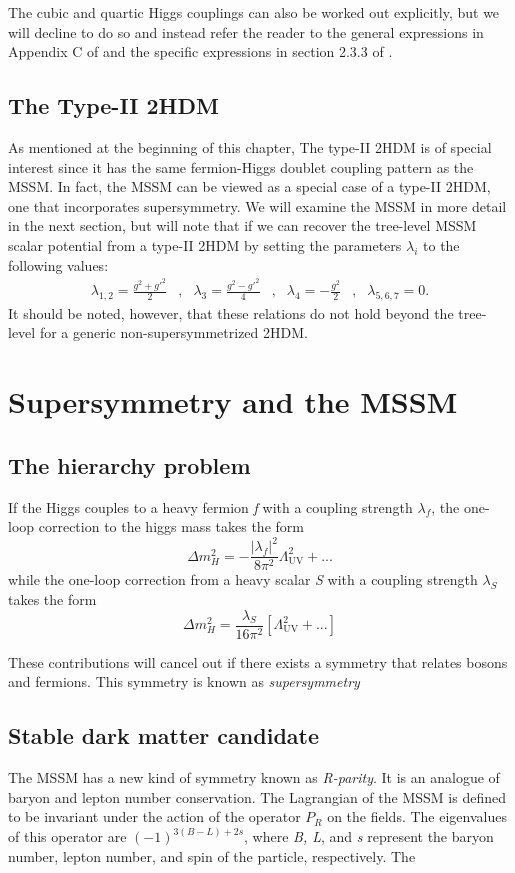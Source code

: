 The cubic and quartic Higgs couplings can also be worked out explicitly, but we will decline to do so and instead refer the reader to the general expressions in Appendix C of  \citep{Branco2012} and the specific expressions in section 2.3.3 of \citep{Kling2016a}. 

\subsection{The Type-II 2HDM}

As mentioned at the beginning of this chapter, The type-II 2HDM is of special interest since it has the same fermion-Higgs doublet coupling pattern as the MSSM. In fact, the MSSM can be viewed as a special case of a type-II 2HDM, one that incorporates supersymmetry. We will examine the MSSM in more detail in the next section, but will note that if we can recover the tree-level MSSM scalar potential from a type-II 2HDM by setting the parameters $\lambda_i$ to the following values:
\begin{align}
\lambda_{1,2} = \frac{g^2+g'^2}{2} &,& \lambda_3 = \frac{g^2-g'^2}{4} &,& \lambda_4 = -\frac{g^2}{2}&,&\lambda_{5,6,7} = 0.
\end{align}
It should be noted, however, that these relations do not hold beyond the tree-level for a generic non-supersymmetrized 2HDM.

\section{Supersymmetry and the MSSM}\label{sec:supersymmetry}

\subsection{The hierarchy problem}

If the Higgs couples to a heavy fermion \emph{f} with a coupling strength $\lambda_f$, the one-loop correction to the higgs mass takes the form
\[\Delta m_H^2 = -\frac{|\lambda_f|^2}{8\pi^2}\Lambda_\text{UV}^2 + ...\]
while the one-loop correction from a heavy scalar \emph{S} with a coupling strength $\lambda_S$ takes the form
\[\Delta m_H^2 = \frac{\lambda_S}{16\pi^2}\left[\Lambda_\text{UV}^2 + ...\right]\]

These contributions will cancel out if there exists a symmetry that relates bosons and fermions. This symmetry is known as \emph{supersymmetry}

\subsection{Stable dark matter candidate}
The MSSM has a new kind of symmetry known as \emph{R-parity}. It is an analogue of baryon and lepton number conservation. The Lagrangian of the MSSM is defined to be invariant under the action of the operator $P_R$ on the fields. The eigenvalues of this operator are $(-1)^{3(B-L)+2s}$, where \emph{B, L}, and \emph{s} represent the baryon number, lepton number, and spin of the particle, respectively. The  

